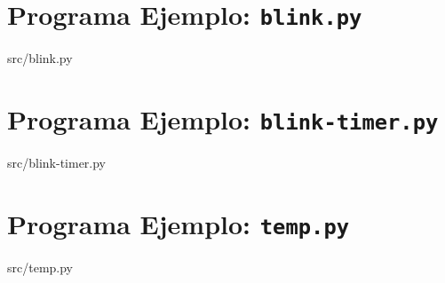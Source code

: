 %
%


\cleardoublepage{}
\section{Programa Ejemplo: \texttt{blink.py}}%
\label{sec:appendix1}
%
{src/blink.py}

\section{Programa Ejemplo: \texttt{blink-timer.py}}%
\label{sec:appendix2}
%
{src/blink-timer.py}

\section{Programa Ejemplo: \texttt{temp.py}}%
\label{sec:appendix3}
%
{src/temp.py}
